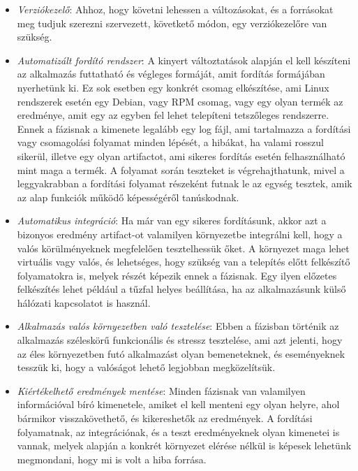 \documentclass[11pt,magyar,a4paper,twoside,]{report}
\providecommand{\tightlist}{%
  \setlength{\itemsep}{0pt}\setlength{\parskip}{0pt}}
\begin{document}
\begin{itemize}
\tightlist
\item
  \emph{Verziókezelő}: Ahhoz, hogy követni lehessen a változásokat, és a
  forrásokat meg tudjuk szerezni szervezett, követkető módon, egy
  verziókezelőre van szükség.
\item
  \emph{Automatizált fordító rendszer}: A kinyert változtatások alapján
  el kell készíteni az alkalmazás futtatható és végleges formáját, amit
  fordítás formájában nyerhetünk ki. Ez sok esetben egy konkrét csomag
  elkészítése, ami Linux rendszerek esetén egy Debian, vagy RPM csomag,
  vagy egy olyan termék az eredménye, amit egy az egyben fel lehet
  telepíteni tetszőleges rendszerre. Ennek a fázisnak a kimenete
  legalább egy log fájl, ami tartalmazza a fordítási vagy csomagolási
  folyamat minden lépését, a hibákat, ha valami rosszul sikerül, illetve
  egy olyan artifactot, ami sikeres fordítás esetén felhasználható mint
  maga a termék. A folyamat során teszteket is végrehajthatunk, mivel a
  leggyakrabban a fordítási folyamat részeként futnak le az egység
  tesztek, amik az alap funkciók működő képességéről tanúskodnak.
\item
  \emph{Automatikus integráció}: Ha már van egy sikeres fordításunk,
  akkor azt a bizonyos eredmény artifact-ot valamilyen környezetbe
  integrálni kell, hogy a valós körülményeknek megfelelően tesztelhessük
  őket. A környezet maga lehet virtuális vagy valós, és lehetséges, hogy
  szükség van a telepítés előtt felkészítő folyamatokra is, melyek
  részét képezik ennek a fázisnak. Egy ilyen előzetes felkészítés lehet
  például a tűzfal helyes beállítása, ha az alkalmazásunk külső hálózati
  kapcsolatot is használ.
\item
  \emph{Alkalmazás valós környezetben való tesztelése}: Ebben a fázisban
  történik az alkalmazás széleskörű funkcionális és stressz tesztelése,
  ami azt jelenti, hogy az éles környezetben futó alkalmazást olyan
  bemeneteknek, és eseményeknek tesszük ki, hogy a valóságot lehető
  legjobban megközelítsük.
\item
  \emph{Kiértékelhető eredmények mentése}: Minden fázisnak van
  valamilyen információval bíró kimenetele, amiket el kell menteni egy
  olyan helyre, ahol bármikor visszakövethető, és kikereshetők az
  eredmények. A fordítási folyamatnak, az integrációnak, és a teszt
  eredményeknek olyan kimenetei is vannak, melyek alapján a konkrét
  környezet elérése nélkül is képesek lehetünk megmondani, hogy mi is
  volt a hiba forrása.
\end{itemize}
\end{document}
